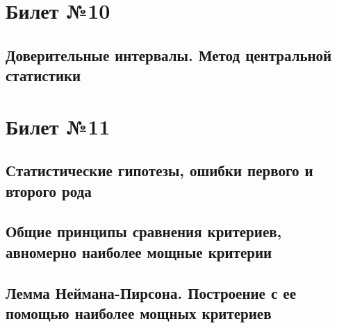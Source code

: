 \documentclass[a4paper]{article}
\theoremstyle{plain}
\theoremstyle{remark}
\theoremstyle{definition}
\begin{document}
\section{Билет №10}
\subsection{Доверительные интервалы. Метод центральной статистики}
\newpage
\section{Билет №11}
\subsection{Статистические гипотезы, ошибки первого и второго рода}
\subsection{Общие принципы сравнения критериев, авномерно наиболее мощные критерии}
\subsection{Лемма Неймана-Пирсона. Построение с ее помощью наиболее мощных критериев}
\end{document}
